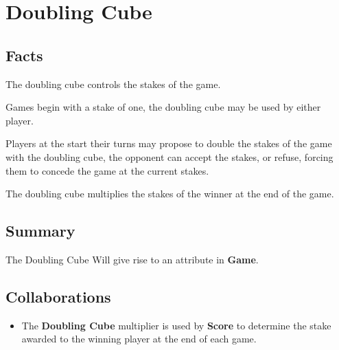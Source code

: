 \section{Doubling Cube}

\subsection{Facts}

\begin{dashed}
    \item The doubling cube controls the stakes of the game.
    \item Games begin with a stake of one, the doubling cube may be used by either player.
    \item Players at the start their turns may propose to double the stakes of the game
    with the doubling cube, the opponent can accept the stakes, or refuse, forcing them
    to concede the game at the current stakes.
    \item The doubling cube multiplies the stakes of the winner at the end of the game.
\end{dashed}

\subsection{Summary}
The Doubling Cube Will give rise to an attribute in \textbf{Game}.

\subsection{Collaborations}

\begin{itemize}
    \item The \textbf{Doubling Cube} multiplier is used by \textbf{Score} to determine the stake awarded to the winning player at the end of each game.
\end{itemize}

